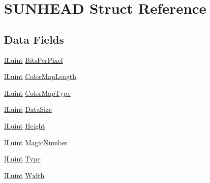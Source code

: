 \hypertarget{struct_s_u_n_h_e_a_d}{\section{S\-U\-N\-H\-E\-A\-D Struct Reference}
\label{struct_s_u_n_h_e_a_d}
}
\subsection*{Data Fields}
\begin{DoxyCompactItemize}
\item 
\hyperlink{il_8h_ac6508d0e9c19e32f32e00d54b5b8cf30}{I\-Luint} \hyperlink{struct_s_u_n_h_e_a_d_a9458475b8169ba61b0126039972084aa}{Bits\-Per\-Pixel}
\item 
\hyperlink{il_8h_ac6508d0e9c19e32f32e00d54b5b8cf30}{I\-Luint} \hyperlink{struct_s_u_n_h_e_a_d_a775a496a1ef6b688aa37d241838588ce}{Color\-Map\-Length}
\item 
\hyperlink{il_8h_ac6508d0e9c19e32f32e00d54b5b8cf30}{I\-Luint} \hyperlink{struct_s_u_n_h_e_a_d_a130732bee6b85c403b97302ba21a7810}{Color\-Map\-Type}
\item 
\hyperlink{il_8h_ac6508d0e9c19e32f32e00d54b5b8cf30}{I\-Luint} \hyperlink{struct_s_u_n_h_e_a_d_ac13981c89126d04405861bd2d1cabaf0}{Data\-Size}
\item 
\hyperlink{il_8h_ac6508d0e9c19e32f32e00d54b5b8cf30}{I\-Luint} \hyperlink{struct_s_u_n_h_e_a_d_a8a8093d76b61a95fc96df24af29b107a}{Height}
\item 
\hyperlink{il_8h_ac6508d0e9c19e32f32e00d54b5b8cf30}{I\-Luint} \hyperlink{struct_s_u_n_h_e_a_d_a6067c2377443ff227cbcd5d99a607e65}{Magic\-Number}
\item 
\hyperlink{il_8h_ac6508d0e9c19e32f32e00d54b5b8cf30}{I\-Luint} \hyperlink{struct_s_u_n_h_e_a_d_a0dfd5e410737b8035ece841196919127}{Type}
\item 
\hyperlink{il_8h_ac6508d0e9c19e32f32e00d54b5b8cf30}{I\-Luint} \hyperlink{struct_s_u_n_h_e_a_d_a4146e7b2b0b4097e0e335f9b348392bf}{Width}
\end{DoxyCompactItemize}


